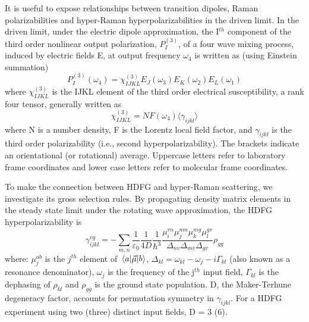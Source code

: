\documentclass[aip, jcp, reprint, onecolumn]{revtex4-2}
\begin{document}
It is useful to expose relationships between transition dipoles, Raman polarizabilities and hyper-Raman hyperpolarizabilities in the driven limit. \cite{Simpson2004}
In the driven limit, under the electric dipole approximation, the I$^{th}$ component of the third order nonlinear output polarization, ${P}^{(3)}_I$, of a four wave mixing process, induced by electric fields E, at output frequency $\omega_4$ is written as (using Einstein summation) \cite{RN307}
\begin{equation} \label{polarization}
{P}^{(3)}_I (\omega_4)  = \chi^{(3)}_{IJKL} E_J(\omega_3) E_K(\omega_2) E_L(\omega_1) 
\end{equation}
where $\chi^{(3)}_{IJKL}$ is the IJKL element of the third order electrical susceptibility, a rank four tensor, generally written as
\begin{equation}
	\chi^{(3)}_{IJKL} = NF(\omega_4) \langle \gamma_{ijkl} \rangle
\end{equation}
where N is a number density, F is the Lorentz local field factor, and $\gamma_{ijkl}$ is the third order polarizability (i.e., second hyperpolarizability). 
The brackets indicate an orientational (or rotational) average.\cite{Andrews1977}
Uppercase letters refer to laboratory frame coordinates and lower case letters refer to molecular frame coordinates.

To make the connection between HDFG and hyper-Raman scattering, we investigate its gross selection rules.
By propagating density matrix elements in the steady state limit under the rotating wave approximation, the HDFG hyperpolarizability is \cite{RN133}
\begin{equation}\label{sivegamma}
		\gamma_{ijkl}^{vg} =	- \sum_{m, n} \frac{1}{\varepsilon_0} \frac{1}{4D} \frac{1}{\hbar^3} \frac{\mu^{vn}_{i} \mu^{nm}_{j} \mu^{mg}_{k} \mu^{gv}_{l} }{\Delta_{nv} \Delta_{mv}\Delta_{gv}}  \rho_{gg}
\end{equation}
where: $\mu^{ab}_{j}$ is the $j^{th}$ element of $\mel{a}{\vec{\mu}}{b}$, $\Delta_{kl} = \omega_{kl} - \omega_{j} - i\Gamma_{kl}$ (also known as a resonance denominator), $\omega_j$ is the frequency of the j$^{th}$ input field, $\Gamma_{kl}$ is the dephasing of $\rho_{kl}$ and $\rho_{gg}$ is the ground state population.
D, the Maker-Terhune degeneracy factor, accounts for permutation symmetry in $\gamma_{ijkl}$.\cite{RN134} 
For a HDFG experiment using two (three) distinct input fields, D = 3 (6).
\end{document}
